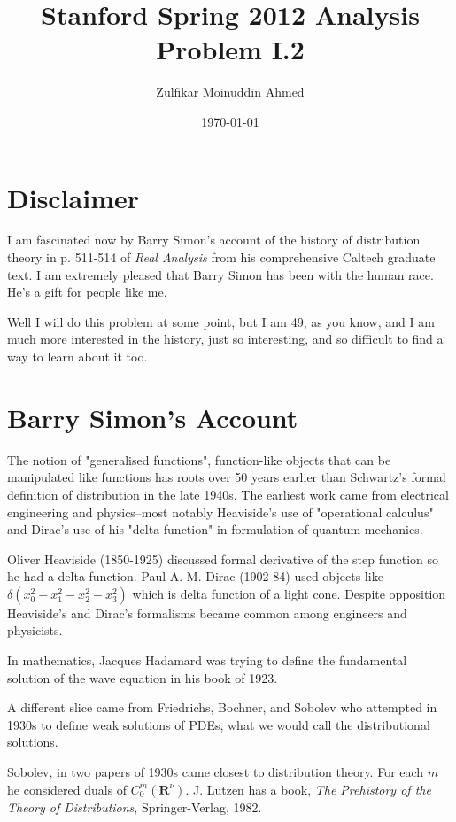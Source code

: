 \documentclass{amsart}
\title{Stanford Spring 2012 Analysis Problem I.2}
\author{Zulfikar Moinuddin Ahmed}
\date{\today}
\begin{document}
\maketitle

\section{Disclaimer}

I am fascinated now by Barry Simon's account of the history of distribution theory in p. 511-514 of {\em Real Analysis} from his comprehensive Caltech graduate text. I am extremely pleased that Barry Simon has been with the human race.  He's a gift for people like me.

Well I will do this problem at some point, but I am 49, as you know, and I am much more interested in the history, just so interesting, and so difficult to find a way to learn about it too.  


\section{Barry Simon's Account}

The notion of "generalised functions", function-like objects that can be manipulated like functions has roots over 50 years earlier than Schwartz's formal definition of distribution in the late 1940s.  The earliest work came from electrical engineering and physics--most notably Heaviside's use of "operational calculus" and Dirac's use of his "delta-function" in formulation of quantum mechanics.

Oliver Heaviside (1850-1925) discussed formal derivative of the step function so he had a delta-function.  Paul A. M. Dirac (1902-84) used objects like $\delta( x_0^2  - x_1^2 - x_2^2 - x_3^2)$ which is delta function of a light cone.  Despite opposition Heaviside's and Dirac's formalisms became common among engineers and physicists.

In mathematics, Jacques Hadamard was trying to define the fundamental solution of the wave equation in his book of 1923.

A different slice came from Friedrichs, Bochner, and Sobolev who attempted in 1930s to define weak solutions of PDEs, what we would call the distributional solutions.  

Sobolev, in two papers of 1930s came closest to distribution theory.  For each $m$ he considered duals of $C^m_0(\mathbf{R}^{\nu})$.  J. Lutzen has a book, {\em The Prehistory of the Theory of Distributions}, Springer-Verlag, 1982.
\end{document}
